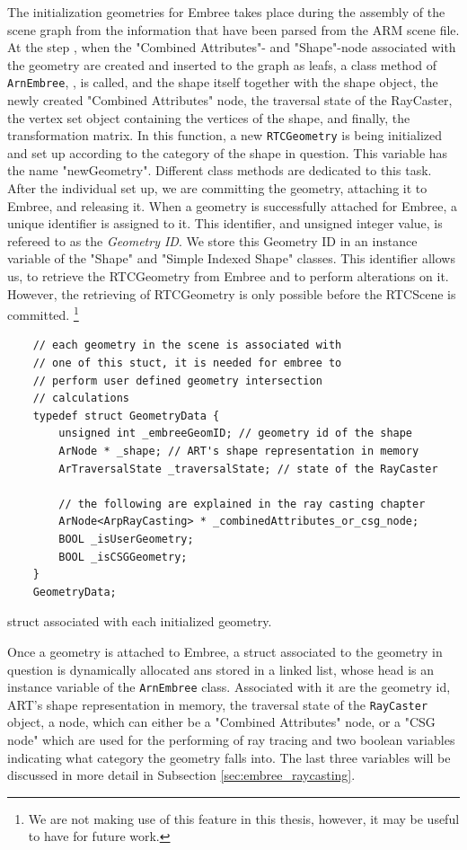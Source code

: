 The initialization geometries for Embree takes place during the assembly of the scene graph from the information that have been parsed from the ARM scene file. At the step , when the "Combined Attributes"- and "Shape"-node associated with the geometry are created and inserted to the graph as leafs, a class method of \texttt{ArnEmbree}, , is called, and the shape itself together with the shape object, the newly created "Combined Attributes" node, the traversal state  of the RayCaster, the vertex set object containing the vertices of the shape, and finally, the transformation matrix. In this function, a new \texttt{RTCGeometry} is being initialized and set up according to the category of the shape in question. This variable has the name "newGeometry". Different class methods are dedicated to this task. After the individual set up, we are committing the geometry, attaching it to Embree, and releasing it. When a geometry is successfully attached for Embree, a unique identifier is assigned to it. This identifier, and unsigned integer value, is refereed to as the \emph{Geometry ID}. We store this Geometry ID in an instance variable of the "Shape" and "Simple Indexed Shape" classes. This identifier allows us, to retrieve the RTCGeometry from Embree and to perform alterations on it. However, the retrieving of RTCGeometry is only possible before the RTCScene is committed. \footnote{We are not making use of this feature in this thesis, however, it may be useful to have for future work.}

\begin{listing} 
	\begin{lstlisting}
	// each geometry in the scene is associated with
	// one of this stuct, it is needed for embree to
	// perform user defined geometry intersection
	// calculations
	typedef struct GeometryData {
		unsigned int _embreeGeomID; // geometry id of the shape
		ArNode * _shape; // ART's shape representation in memory
		ArTraversalState _traversalState; // state of the RayCaster
		
		// the following are explained in the ray casting chapter
		ArNode<ArpRayCasting> * _combinedAttributes_or_csg_node;
		BOOL _isUserGeometry; 
		BOOL _isCSGGeometry;
	}
	GeometryData;
	\end{lstlisting}
	\caption{ struct associated with each initialized geometry.}
	\label{lst:user_data}
\end{listing}

Once a geometry is attached to Embree, a  struct associated to the geometry in question is dynamically allocated ans stored in a linked list, whose head is an instance variable of the \texttt{ArnEmbree} class. Associated with it are the geometry id, ART's shape representation in memory, the traversal state of the \texttt{RayCaster} object, a node, which can either be a "Combined Attributes" node, or a "CSG node" which are used for the performing of ray tracing and two boolean variables indicating what category the geometry falls into. The last three variables will be discussed in more detail in Subsection \ref{sec:embree_raycasting}.


